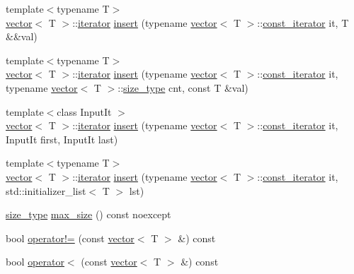 \begin{DoxyCompactItemize}
{\footnotesize template$<$typename T$>$ }\\\mbox{\hyperlink{classvector}{vector}}$<$ T $>$\+::\mbox{\hyperlink{classvector_a35c955cacac6aacaa1e82874b1628865}{iterator}} \mbox{\hyperlink{classvector_a6ab64206e07e4e80710300aced53d444}{insert}} (typename \mbox{\hyperlink{classvector}{vector}}$<$ T $>$\+::\mbox{\hyperlink{classvector_a2fc97dce62b7053449cc868607540dba}{const\+\_\+iterator}} it, T \&\&val)
\item 
{\footnotesize template$<$typename T$>$ }\\\mbox{\hyperlink{classvector}{vector}}$<$ T $>$\+::\mbox{\hyperlink{classvector_a35c955cacac6aacaa1e82874b1628865}{iterator}} \mbox{\hyperlink{classvector_aa0148422cb4a2551778e886a86813c27}{insert}} (typename \mbox{\hyperlink{classvector}{vector}}$<$ T $>$\+::\mbox{\hyperlink{classvector_a2fc97dce62b7053449cc868607540dba}{const\+\_\+iterator}} it, typename \mbox{\hyperlink{classvector}{vector}}$<$ T $>$\+::\mbox{\hyperlink{classvector_ada51e68d31936547d3729c82daf6b7c6}{size\+\_\+type}} cnt, const T \&val)
\item 
{\footnotesize template$<$class Input\+It $>$ }\\\mbox{\hyperlink{classvector}{vector}}$<$ T $>$\+::\mbox{\hyperlink{classvector_a35c955cacac6aacaa1e82874b1628865}{iterator}} \mbox{\hyperlink{classvector_a5abe2c95bfad8ac5297294f0024a4c11}{insert}} (typename \mbox{\hyperlink{classvector}{vector}}$<$ T $>$\+::\mbox{\hyperlink{classvector_a2fc97dce62b7053449cc868607540dba}{const\+\_\+iterator}} it, Input\+It first, Input\+It last)
\item 
{\footnotesize template$<$typename T$>$ }\\\mbox{\hyperlink{classvector}{vector}}$<$ T $>$\+::\mbox{\hyperlink{classvector_a35c955cacac6aacaa1e82874b1628865}{iterator}} \mbox{\hyperlink{classvector_a6941eb89e5693b388e49d5fdf96dc24e}{insert}} (typename \mbox{\hyperlink{classvector}{vector}}$<$ T $>$\+::\mbox{\hyperlink{classvector_a2fc97dce62b7053449cc868607540dba}{const\+\_\+iterator}} it, std\+::initializer\+\_\+list$<$ T $>$ lst)
\item 
\mbox{\hyperlink{classvector_ada51e68d31936547d3729c82daf6b7c6}{size\+\_\+type}} \mbox{\hyperlink{classvector_a972fbaa1a8a003f5a7eec364354982f9}{max\+\_\+size}} () const noexcept
\item 
bool \mbox{\hyperlink{classvector_ac89b6dd8e249534db8f28a2c34ece842}{operator!=}} (const \mbox{\hyperlink{classvector}{vector}}$<$ T $>$ \&) const
\item 
bool \mbox{\hyperlink{classvector_a6b8e2532dd091d49a19ad5a92fa88742}{operator$<$}} (const \mbox{\hyperlink{classvector}{vector}}$<$ T $>$ \&) const

\end{DoxyCompactItemize}
